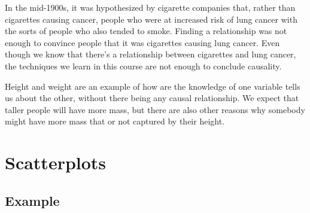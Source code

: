 \documentclass[
  letterpaper,
  DIV=11,
  numbers=noendperiod,
  oneside]{scrreprt}
\begin{document}
In the mid-1900s, it was hypothesized by cigarette companies that,
rather than cigarettes causing cancer, people who were at increased risk
of lung cancer with the sorts of people who also tended to smoke.
Finding a relationship was not enough to convince people that it was
cigarettes causing lung cancer. Even though we know that there's a
relationship between cigarettes and lung cancer, the techniques we learn
in this course are not enough to conclude causality.

Height and weight are an example of how are the knowledge of one
variable tells us about the other, without there being any causal
relationship. We expect that taller people will have more mass, but
there are also other reasons why somebody might have more mass that or
not captured by their height.

\hypertarget{scatterplots}{%
\section{Scatterplots}\label{scatterplots}}

\hypertarget{example}{%
\subsection{Example}\label{example}}
\end{document}
